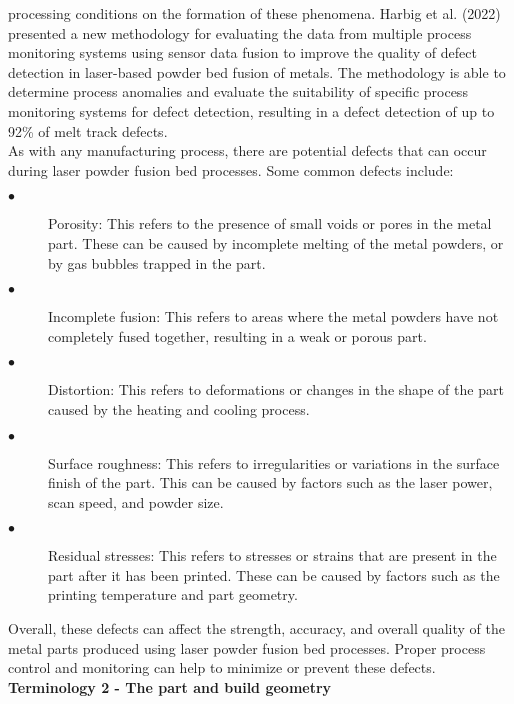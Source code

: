     processing conditions on the formation of these phenomena. Harbig et al. (2022) presented a new methodology for evaluating the data from multiple process monitoring systems using sensor data fusion to improve the quality of defect detection in laser-based powder bed fusion of metals. The methodology is able to determine process anomalies and evaluate the suitability of specific process monitoring systems for defect detection, resulting in a defect detection of up to 92\% of melt track defects.\\
    As with any manufacturing process, there are potential defects that can occur during laser powder fusion bed processes. Some common defects include:
    \begin{description}
    \item[$\bullet$] Porosity: This refers to the presence of small voids or pores in the metal part. These can be caused by incomplete melting of the metal powders, or by gas bubbles trapped in the part.
    \item[$\bullet$ ] Incomplete fusion: This refers to areas where the metal powders have not completely fused together, resulting in a weak or porous part.
    \item[$\bullet$ ] Distortion: This refers to deformations or changes in the shape of the part caused by the heating and cooling process.
    \item[$\bullet$ ] Surface roughness: This refers to irregularities or variations in the surface finish of the part. This can be caused by factors such as the laser power, scan speed, and powder size.
    \item[$\bullet$ ] Residual stresses: This refers to stresses or strains that are present in the part after it has been printed. These can be caused by factors such as the printing temperature and part geometry.
    \end{description}
    Overall, these defects can affect the strength, accuracy, and overall quality of the metal parts produced using laser powder fusion bed processes. Proper process control and monitoring can help to minimize or prevent these defects.\\

    \textbf{Terminology 2 - The part and build geometry}\


